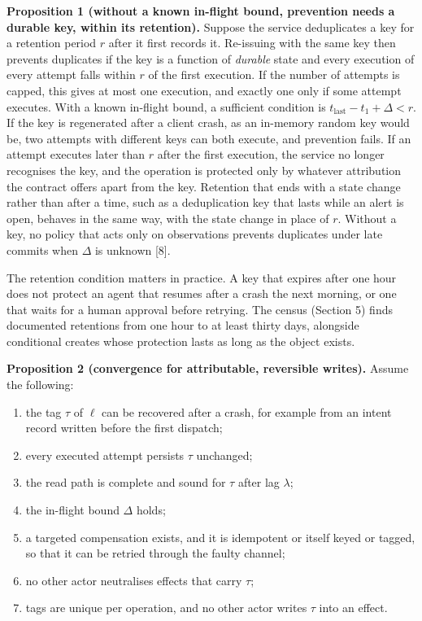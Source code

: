 \documentclass[
  10pt,
]{article}
\providecommand{\tightlist}{%
  \setlength{\itemsep}{0pt}\setlength{\parskip}{0pt}}
\begin{document}
\textbf{Proposition 1 (without a known in-flight bound, prevention needs
a durable key, within its retention).} Suppose the service deduplicates
a key for a retention period \(r\) after it first records it. Re-issuing
with the same key then prevents duplicates if the key is a function of
\emph{durable} state and every execution of every attempt falls within
\(r\) of the first execution. If the number of attempts is capped, this
gives at most one execution, and exactly one only if some attempt
executes. With a known in-flight bound, a sufficient condition is
\(t_{\text{last}} - t_1 + \Delta < r\). If the key is regenerated after
a client crash, as an in-memory random key would be, two attempts with
different keys can both execute, and prevention fails. If an attempt
executes later than \(r\) after the first execution, the service no
longer recognises the key, and the operation is protected only by
whatever attribution the contract offers apart from the key. Retention
that ends with a state change rather than after a time, such as a
deduplication key that lasts while an alert is open, behaves in the same
way, with the state change in place of \(r\). Without a key, no policy
that acts only on observations prevents duplicates under late commits
when \(\Delta\) is unknown {[}8{]}.

The retention condition matters in practice. A key that expires after
one hour does not protect an agent that resumes after a crash the next
morning, or one that waits for a human approval before retrying. The
census (Section 5) finds documented retentions from one hour to at least
thirty days, alongside conditional creates whose protection lasts as
long as the object exists.

\textbf{Proposition 2 (convergence for attributable, reversible
writes).} Assume the following:

\begin{enumerate}
\def\labelenumi{(\alph{enumi})}
\tightlist
\item
  the tag \(\tau\) of \(\ell\) can be recovered after a crash, for
  example from an intent record written before the first dispatch;
\item
  every executed attempt persists \(\tau\) unchanged;
\item
  the read path is complete and sound for \(\tau\) after lag
  \(\lambda\);
\item
  the in-flight bound \(\Delta\) holds;
\item
  a targeted compensation exists, and it is idempotent or itself keyed
  or tagged, so that it can be retried through the faulty channel;
\item
  no other actor neutralises effects that carry \(\tau\);
\item
  tags are unique per operation, and no other actor writes \(\tau\) into
  an effect.
\end{enumerate}
\end{document}
